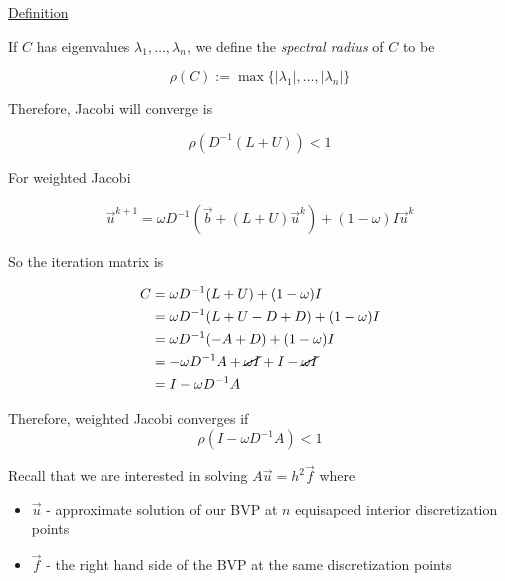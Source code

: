 \underline{Definition}

If $C$ has eigenvalues $\lambda_1, \ldots, \lambda_n$, we define the
\emph{spectral radius} of $C$ to be

\begin{equation*}
\rho(C) := \max \{|\lambda_1|, \ldots, |\lambda_n|\}
\end{equation*}

Therefore, Jacobi will converge is

\begin{equation*}
  \rho\left( D^{-1} (L+U)\right) < 1
\end{equation*}

For weighted Jacobi

\begin{align*}
\vec{u}^{k+1} = \omega D^{-1}\left(\vec{b}+(L +U)\vec{u}^k\right) + (1-\omega)I\vec{u}^k
\end{align*}

So the iteration matrix is

\begin{align*}
C &= \omega D^{-1}(L + U) + (1-\omega)I \\ 
  &= \omega D^{-1}(L + U - D + D) + (1-\omega)I \\ 
  &= \omega D^{-1}(- A + D) + (1-\omega)I \\ 
  &= -\omega D^{-1}A + \cancel{\omega I} + I - \cancel{\omega I} \\ 
  &= I-\omega D^{-1}A
\end{align*}

Therefore, weighted Jacobi converges if
\begin{equation*}
\rho(I-\omega D^{-1}A) < 1
\end{equation*}

Recall that we are interested in solving $A\vec{u}=h^2\vec{f}$ where

\begin{itemize}[label={}]
\item $\vec{u}$ - approximate solution of our BVP at $n$ equisapced interior
  discretization points
  \item $\vec{f}$ - the right hand side of the BVP at the same discretization points
\end{itemize}

